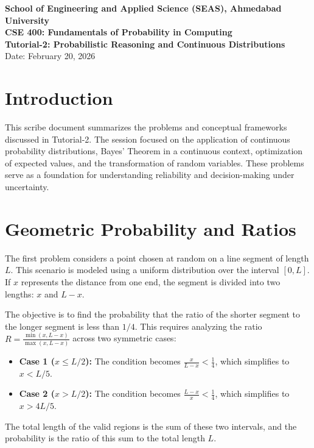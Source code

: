 \documentclass[11pt]{article}
\begin{document}
\begin{center}
    \textbf{\Large School of Engineering and Applied Science (SEAS), Ahmedabad University} \\
    \vspace{5pt}
    \textbf{CSE 400: Fundamentals of Probability in Computing} \\
    \vspace{5pt}
    \textbf{Tutorial-2: Probabilistic Reasoning and Continuous Distributions} \\
    \vspace{5pt}
    Date: February 20, 2026
\end{center}

\hr
\vspace{10pt}

\section{Introduction}
This scribe document summarizes the problems and conceptual frameworks discussed in Tutorial-2. The session focused on the application of continuous probability distributions, Bayes' Theorem in a continuous context, optimization of expected values, and the transformation of random variables. These problems serve as a foundation for understanding reliability and decision-making under uncertainty.

\section{Geometric Probability and Ratios}
The first problem considers a point chosen at random on a line segment of length $L$. This scenario is modeled using a uniform distribution over the interval $[0, L]$. If $x$ represents the distance from one end, the segment is divided into two lengths: $x$ and $L-x$. 

The objective is to find the probability that the ratio of the shorter segment to the longer segment is less than $1/4$. This requires analyzing the ratio $R = \frac{\min(x, L-x)}{\max(x, L-x)}$ across two symmetric cases:
\begin{itemize}
    \item \textbf{Case 1 ($x \le L/2$):} The condition becomes $\frac{x}{L-x} < \frac{1}{4}$, which simplifies to $x < L/5$.
    \item \textbf{Case 2 ($x > L/2$):} The condition becomes $\frac{L-x}{x} < \frac{1}{4}$, which simplifies to $x > 4L/5$.
\end{itemize}
The total length of the valid regions is the sum of these two intervals, and the probability is the ratio of this sum to the total length $L$.
\end{document}
